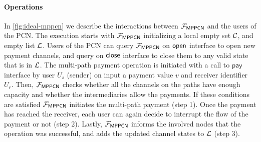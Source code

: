 \paragraph{Operations}
In \cref{fig:ideal-mppcn} we describe the interactions between $\mathcal{F}_{\mathsf{MPPCN}}$ and the 
users of the PCN. The execution starts with $\mathcal{F}_{\mathsf{MPPCN}}$ initializing a local empty 
set $\mathcal{C}$, and empty list $\mathcal{L}$. Users of the PCN can query $\mathcal{F}_{\mathsf{MPPCN}}$ on $\mathsf{open}$ 
interface to open new payment channels, and query on $\mathsf{close}$ interface to close them to any 
valid state that is in $\mathcal{L}$. The multi-path payment operation is initiated with a call to 
$\mathsf{pay}$ interface by user $U_s$ (sender) on input a payment value $v$ and receiver 
identifier $U_r$. Then, $\mathcal{F}_{\mathsf{MPPCN}}$ checks whether all the channels on the paths 
have enough capacity and whether the intermediaries allow the payments. If these conditions are 
satisfied $\mathcal{F}_{\mathsf{MPPCN}}$ initiates the multi-path payment (step 1). Once the payment has 
reached the receiver, each user can again decide to interrupt the flow of the payment or not 
(step 2). Lastly, $\mathcal{F}_{\mathsf{MPPCN}}$ informs the involved nodes that the operation was 
successful, and adds the updated channel states to $\mathcal{L}$ (step 3).

